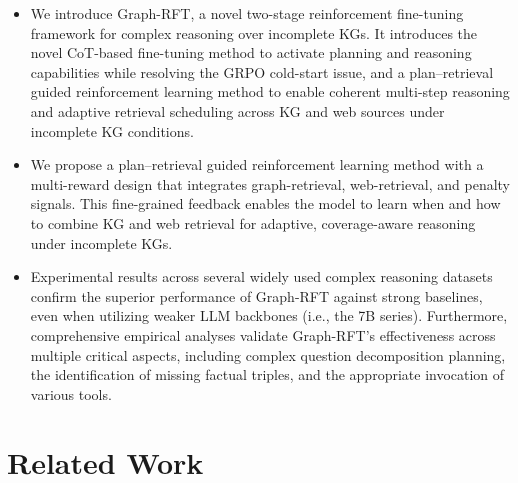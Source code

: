 \documentclass[sigconf]{acmart}
\begin{document}
\begin{itemize}[itemsep=0.5ex, leftmargin=3mm]
\item  We introduce Graph-RFT, a novel two-stage reinforcement fine-tuning framework for complex reasoning over incomplete KGs. It introduces the novel CoT-based fine-tuning method to activate planning and reasoning capabilities while resolving the GRPO cold-start issue, and a plan–retrieval guided reinforcement learning method to enable coherent multi-step reasoning and adaptive retrieval scheduling across KG and web sources under incomplete KG conditions.

\item  We propose a plan–retrieval guided reinforcement learning method with a multi-reward design that integrates graph-retrieval, web-retrieval, and penalty signals. This fine-grained feedback enables the model to learn when and how to combine KG and web retrieval for adaptive, coverage-aware reasoning under incomplete KGs.
\item  Experimental results across several widely used complex reasoning datasets confirm the superior performance of Graph-RFT against strong baselines, even when utilizing weaker LLM backbones (i.e., the 7B series). Furthermore, comprehensive empirical analyses validate Graph-RFT's effectiveness across multiple critical aspects, including complex question decomposition planning, the identification of missing factual triples, and the appropriate invocation of various tools.
\end{itemize}
\section{Related Work}
\end{document}
